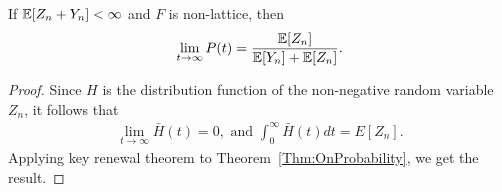 \documentclass[a4paper,10pt,english]{article}
\begin{document}
\begin{cor}
\label{cor:Limiting ON probability}
If $\mathbb{E}[Z_n+Y_n]< \infty $ and $F$ is non-lattice, then
\begin{equation*}
\lim_{t \rightarrow \infty}P(t)=\frac{\mathbb{E}[Z_n]}{\mathbb{E}[Y_n]+\mathbb{E}[Z_n]}.
\end{equation*}
\end{cor}
\begin{proof} Since $H$ is the distribution function of the non-negative random variable $Z_n$, it follows that 
\begin{align*}
\lim_{t \rightarrow \infty}\bar{H}(t) = 0, \text{ and } \int_0^\infty \bar{H}(t)dt = E[Z_n].
\end{align*}
Applying key renewal theorem to Theorem~\ref{Thm:OnProbability}, we get the result.
\end{proof}
\end{document}
